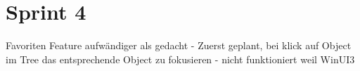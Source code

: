 \section{Sprint 4}


Favoriten Feature aufwändiger als gedacht
- Zuerst geplant, bei klick auf Object im Tree das entsprechende Object zu fokusieren
   - nicht funktioniert weil WinUI3